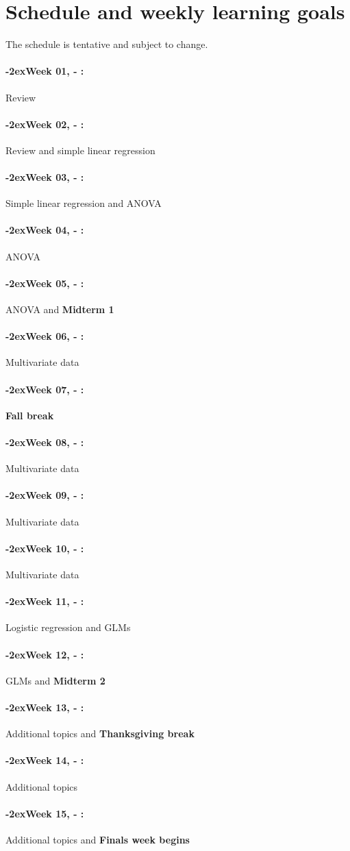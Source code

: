 \documentclass[11pt]{article}
\newcommand{\week}[1]{%
	\paragraph*{\kern-2ex\quad #1, \syldate{\today} - \AdvanceDate[4]\syldate{\today}:}%
	\ifdim\wd1=\wd\MONDAY
	\AdvanceDate[7]
	\else
	\AdvanceDate[7]
	\fi%
}
\begin{document}
	\newpage
	\section*{Schedule and weekly learning goals}
	The schedule is tentative and subject to change. 
	\SetDate[26/08/2019]
	\week{Week 01} Review
	
	\week{Week 02} Review and simple linear regression
	
	\week{Week 03} Simple linear regression and ANOVA 
	
	\week{Week 04} ANOVA
	
	\week{Week 05}  ANOVA and \textbf{Midterm 1}
	
	\week{Week 06} Multivariate data
	
	\week{Week 07} \textbf{Fall break}
	
	\week{Week 08} Multivariate data
	
	\week{Week 09} Multivariate data
	
	\week{Week 10} Multivariate data
	
	\week{Week 11} Logistic regression and GLMs
	
	\week{Week 12} GLMs and  \textbf{Midterm 2}
	
	\week{Week 13}  Additional topics and \textbf{Thanksgiving break}
	
	\week{Week 14} Additional topics 
	
	\week{Week 15} Additional topics and \textbf{Finals week begins}

	
\end{document}
